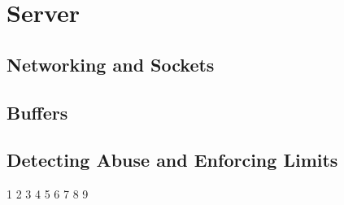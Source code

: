 \section{Server}

\subsection{Networking and Sockets}

\subsection{Buffers}

\subsection{Detecting Abuse and Enforcing Limits}
1
2
3
4
5
6
7
8
9
